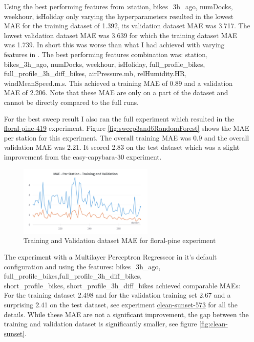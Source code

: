 \documentclass[a4paper]{article}
\begin{document}
    Using the best performing features from :station, bikes\_3h\_ago, numDocks, weekhour, isHoliday
    only varying the hyperparameters resulted in the lowest MAE for the training dataset of 1.392, its validation dataset MAE was 3.717.
    The lowest validation dataset MAE was 3.639 for which the training dataset
    MAE was 1.739. In short this was worse than what I had achieved with varying features in .
    The best performing features combination was: station, bikes\_3h\_ago, numDocks, weekhour, isHoliday, full\_profile\_bikes,
    full\_profile\_3h\_diff\_bikes, airPressure.mb, relHumidity.HR, windMeanSpeed.m.s. This achieved a training MAE of 0.89
    and a validation MAE of 2.206. Note that these MAE are only on a part of the dataset and cannot be directly compared
    to the full runs.

    For the best sweep result I also ran the full experiment which resulted in the
    \href{https://wandb.ai/idegen/mlp-2021/runs/2kmp7odq?workspace=user-idegen}{floral-pine-419} experiment. Figure \ref{fig:sweep3and6RandomForest}
    shows the MAE per station for this experiment. The overall training MAE was 0.9 and the overall validation MAE was
    2.21. It scored 2.83 on the test dataset which was a slight improvement from the easy-capybara-30 experiment.

    \begin{figure}[h]
        \centering
        \includegraphics[width=0.6\textwidth]{floral-pine}
        \caption{Training and Validation dataset MAE for floral-pine experiment}
        \label{fig:floral-pine}
    \end{figure}

    The experiment with a Multilayer Perceptron Regresseor in it's default configuration and using the features: bikes\_3h\_ago,
    full\_profile\_bikes,full\_profile\_3h\_diff\_bikes,\\short\_profile\_bikes, short\_profile\_3h\_diff\_bikes achieved
    comparable MAEs: For the training dataset 2.498 and for the validation training set 2.67 and a surprising 2.41 on the test dataset,
    see experiment \href{https://wandb.ai/idegen/mlp-2021/runs/1of4938t?workspace=user-idegen}{clean-sunset-573} for all the details.
    While these MAE are not a significant improvement, the gap between the training and validation dataset is significantly
    smaller, see figure \ref{fig:clean-sunset}.
\end{document}
